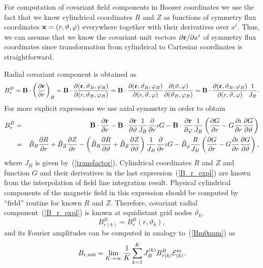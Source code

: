 \documentclass[12pt]{article}
\newcommand{\be}[1]{\begin{equation} \label{#1}}
\newcommand{\ee}{\end{equation}}
\newcommand{\bea}[1]{\begin{eqnarray} \label{#1}}
\newcommand{\eea}{\end{eqnarray}}
\newcommand{\eq}[1]{(\ref{#1})}
\newcommand{\difp}[2]{\frac{\partial #1}{\partial #2}}
\newcommand{\br}{{\bf r}}
\newcommand{\bB}{{\bf B}}
\newcommand{\bx}{{\bf x}}
\newcommand{\cE}{{\cal E}}
\begin{document}
For computation of covariant field components in Boozer coordinates 
we use the fact that we know cylindrical coordinates $R$ and $Z$ as functions of symmetry flux coordinates $\bx=(r,\vartheta,\varphi)$
everywhere together with their derivatives over $x^i$. Thus, we can assume that we know the covariant unit vectors 
$\partial \br / \partial x^i$ of symmetry flux coordinates since transformation from cylindrical to Cartesian coordinates is straightforward.

\noindent
Radial covariant component is obtained as
\be{B_r}
B_r^B = \bB\cdot\left(\difp{\br}{r}\right)_B = \bB\cdot\difp{(\br,\vartheta_B,\varphi_B)}{(r,\vartheta_B,\varphi_B)}
= \bB\cdot\difp{(\br,\vartheta_B,\varphi_B)}{(r,\vartheta,\varphi)}\difp{(\vartheta,\varphi)}{(\vartheta_B,\varphi_B)}
= \bB\cdot\difp{(\br,\vartheta_B,\varphi_B)}{(r,\vartheta,\varphi)}\frac{1}{J_B}.
\ee
For more explicit expressions we use axial symmetry in order to obtain
\bea{B_r_expl}
B_r^B 
&=&
\bB\cdot\difp{\br}{r}-\bB\cdot\difp{\br}{\vartheta}\frac{1}{J_B}\difp{}{r}\iota G
-\bB\cdot\difp{\br}{\varphi}\frac{1}{J_B}\left(\difp{G}{r}-G\difp{\iota}{r}\difp{G}{\vartheta}\right)
\\
&=&
\hat B_R \difp{R}{r}+\hat B_Z \difp{Z}{r}
-\left(\hat B_R \difp{R}{\vartheta}+\hat B_Z \difp{Z}{\vartheta}\right)\frac{1}{J_B}\difp{}{r}\iota G
- \hat B_\varphi \frac{R}{J_B}\left(\difp{G}{r}-G\difp{\iota}{r}\difp{G}{\vartheta}\right),
\nonumber
\eea
where $J_B$ is given by~\eq{transfactor}. Cylindrical coordinates $R$ and $Z$ and function $G$ and their derivatives 
in the last expression~\eq{B_r_expl} are known from the interpolation of field line integration result. 
Physical cylindrical components of the magnetic field in this expression should be computed by ``field'' routine
for known $R$ and $Z$. Therefore, covariant radial component~\eq{B_r_expl} is known at equidistant grid
nodes $\vartheta_k$,
\be{B_r_nodes}
B_{r(k)}^B = B_r^B(r,\vartheta_k),
\ee
and its Fourier amplitudes can be computed in analogy to~\eq{Bm0num} as
\be{Brm0num}
B_{r,m0}=\lim_{K\rightarrow\infty}\frac{1}{K}\sum\limits_{k=1}^K J_B^{(k)} B_{r(k)}^B \cE_{(k)}^m.
\ee
\end{document}
